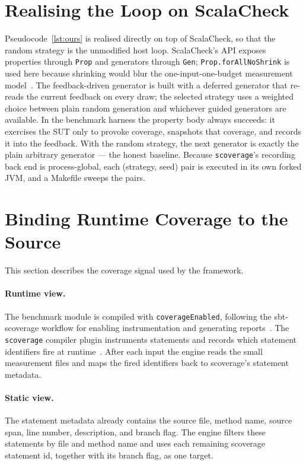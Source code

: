 \documentclass[11pt,a4paper]{report}
\begin{document}
\section{Realising the Loop on ScalaCheck}
\label{sec:loop}

Pseudocode~\ref{lst:ours} is realised directly on top of ScalaCheck, so that the random strategy is the
unmodified host loop. ScalaCheck's API exposes properties through \texttt{Prop} and generators through
\texttt{Gen}; \texttt{Prop.forAllNoShrink} is used here because shrinking would blur the one-input-one-budget
measurement model~\cite{scalacheckguide}. The feedback-driven generator is built with a deferred generator
that re-reads the current feedback on every draw; the selected strategy uses a weighted choice between plain
random generation and whichever guided generators are available. In the benchmark harness the property body
always succeeds: it exercises the SUT only to provoke coverage, snapshots that coverage, and records it into
the feedback. With the random strategy, the next generator is exactly the plain arbitrary generator — the
honest baseline. Because \texttt{scoverage}'s recording back end is process-global, each (strategy, seed)
pair is executed in its own forked JVM, and a Makefile sweeps the pairs.

\section{Binding Runtime Coverage to the Source}
\label{sec:cov-impl}

This section describes the coverage signal used by the framework.

\paragraph{Runtime view.} The benchmark module is compiled with \texttt{coverageEnabled}, following the
sbt-scoverage workflow for enabling instrumentation and generating reports~\cite{sbtscoverage}. The
\texttt{scoverage} compiler plugin instruments statements and records which statement identifiers fire at
runtime~\cite{scoverage}. After each input the engine reads the small measurement files and maps the fired
identifiers back to scoverage's statement metadata.

\paragraph{Static view.} The statement metadata already contains the source file, method name, source span,
line number, description, and branch flag. The engine filters these statements by file and method name and
uses each remaining scoverage statement id, together with its branch flag, as one target.
\end{document}
